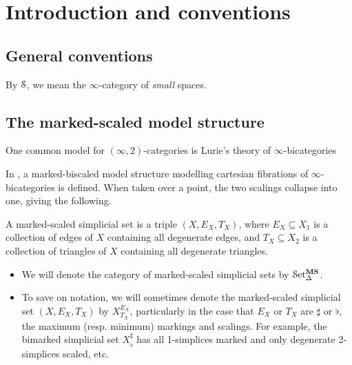 \documentclass[main.tex]{subfiles}
\begin{document}
\section{Introduction and conventions}
\label{sec:introduction_and_conventions}

\subsection{General conventions}
\label{ssc:general_conventions}

By $\S$, we mean the $\infty$-category of \emph{small} spaces.

\subsection{The marked-scaled model structure}
\label{ssc:marked-scaled_model_structure}

One common model for $(\infty,2)$-categories is Lurie's theory of $\infty$-bicategories

In \cite{garcia20212}, a marked-biscaled model structure modelling cartesian fibrations of $\infty$-bicategories is defined. When taken over a point, the two scalings collapse into one, giving the following.

\begin{definition}
  \label{def:marked-scaled_simplicial_set}
  A marked-scaled simplicial set is a triple $(X, E_{X}, T_{X})$, where $E_{X} \subseteq X_{1}$ is a collection of edges of $X$ containing all degenerate edges, and $T_{X} \subseteq X_{2}$ is a collection of triangles of $X$ containing all degenerate triangles.
\end{definition}

\begin{notation}
  \leavevmode
  \begin{itemize}
    \item We will denote the category of marked-scaled simplicial sets by $\SSetms$.

    \item To save on notation, we will sometimes denote the marked-scaled simplicial set $(X, E_{X}, T_{X})$ by $X^{E_{X}}_{T_{X}}$, particularly in the case that $E_{X}$ or $T_{X}$ are $\sharp$ or $\flat$, the maximum (resp. minimum) markings and scalings. For example, the bimarked simplicial set $X^{\sharp}_{\flat}$ has all 1-simplices marked and only degenerate 2-simplices scaled, etc.
  \end{itemize}
\end{notation}
\end{document}
